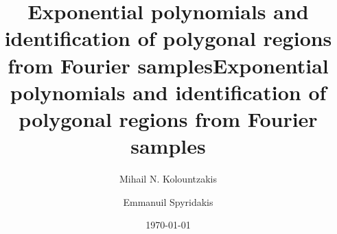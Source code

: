 \documentclass[12pt,a4paper,oneside]{amsart}
\theoremstyle{definition}
\begin{document}
\ifdefined\SMART
\title[Exponential polynomials and polygonal regions]{Exponential polynomials and identification of polygonal regions from Fourier samples}
\else
\title[Exponential polynomials and identification of polygonal regions]{Exponential polynomials and identification of polygonal regions from Fourier samples}
\fi

\author{Mihail N. Kolountzakis}
\address{\href{http://math.uoc.gr/en/index.html}{Department of Mathematics and Applied Mathematics}, University of Crete,\\Voutes Campus, 70013 Heraklion, Greece,\\and\\ \href{https://ics.forth.gr/}{Institute of Computer Science}, Foundation of Research and Technology Hellas, N. Plastira 100, Vassilika Vouton, 700 13, Heraklion, Greece}

\author{Emmanuil Spyridakis}
\address{\href{http://math.uoc.gr/en/index.html}{Department of Mathematics and Applied Mathematics}, University of Crete,\\Voutes Campus, 70013 Heraklion, Greece.}

\makeatletter
{}
\makeatother
{}



\date{\today}
\end{document}

